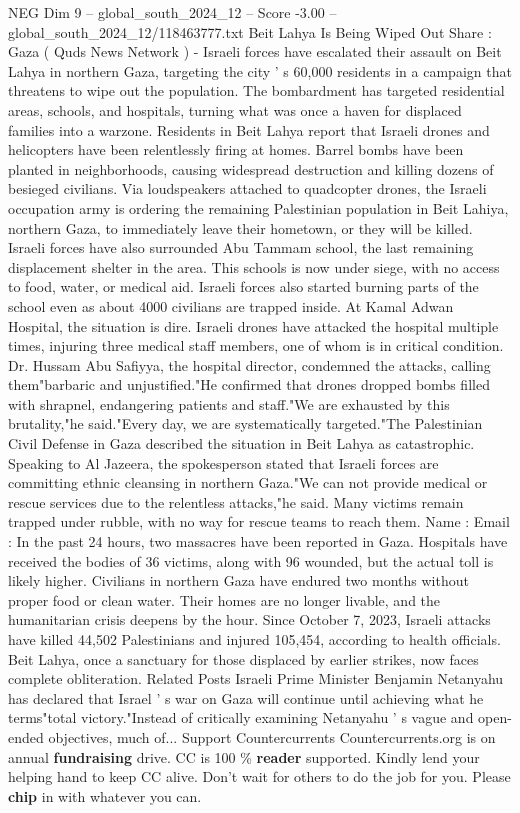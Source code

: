 \begin{textsample}{NEG Dim 9 – global\_south\_2024\_12 – Score -3.00 – global\_south\_2024\_12/118463777.txt}  \label{ex:f9_neg_129}
Beit Lahya Is Being Wiped Out Share : Gaza ( Quds News Network ) - Israeli forces have escalated their assault on Beit Lahya in northern Gaza, targeting the city ' s 60,000 residents in a campaign that threatens to wipe out the population.
The bombardment has targeted residential areas, schools, and hospitals, turning what was once a haven for displaced families into a warzone.
Residents in Beit Lahya report that Israeli drones and helicopters have been relentlessly firing at homes.
Barrel bombs have been planted in neighborhoods, causing widespread destruction and killing dozens of besieged civilians.
Via loudspeakers attached to quadcopter drones, the Israeli occupation army is ordering the remaining Palestinian population in Beit Lahiya, northern Gaza, to immediately leave their hometown, or they will be killed.
Israeli forces have also surrounded Abu Tammam school, the last remaining displacement shelter in the area.
This schools is now under siege, with no access to food, water, or medical aid.
Israeli forces also started burning parts of the school even as about 4000 civilians are trapped inside.
At Kamal Adwan Hospital, the situation is dire.
Israeli drones have attacked the hospital multiple times, injuring three medical staff members, one of whom is in critical condition.
Dr.
Hussam Abu Safiyya, the hospital director, condemned the attacks, calling them"barbaric and unjustified."He confirmed that drones dropped bombs filled with shrapnel, endangering patients and staff."We are exhausted by this brutality,"he said."Every day, we are systematically targeted."The Palestinian Civil Defense in Gaza described the situation in Beit Lahya as catastrophic.
Speaking to Al Jazeera, the spokesperson stated that Israeli forces are committing ethnic cleansing in northern Gaza."We can not provide medical or rescue services due to the relentless attacks,"he said.
Many victims remain trapped under rubble, with no way for rescue teams to reach them.
Name : Email : In the past 24 hours, two massacres have been reported in Gaza.
Hospitals have received the bodies of 36 victims, along with 96 wounded, but the actual toll is likely higher.
Civilians in northern Gaza have endured two months without proper food or clean water.
Their homes are no longer livable, and the humanitarian crisis deepens by the hour.
Since October 7, 2023, Israeli attacks have killed 44,502 Palestinians and injured 105,454, according to health officials.
Beit Lahya, once a sanctuary for those displaced by earlier strikes, now faces complete obliteration.
Related Posts Israeli Prime Minister Benjamin Netanyahu has declared that Israel ' s war on Gaza will continue until achieving what he terms"total victory."Instead of critically examining Netanyahu ' s vague and open-ended objectives, much of...
Support Countercurrents Countercurrents.org is on annual \textbf{fundraising} drive.
CC is 100 \% \textbf{reader} supported.
Kindly lend your helping hand to keep CC alive.
Don't wait for others to do the job for you.
Please \textbf{chip} in with whatever you can.

\end{textsample}
